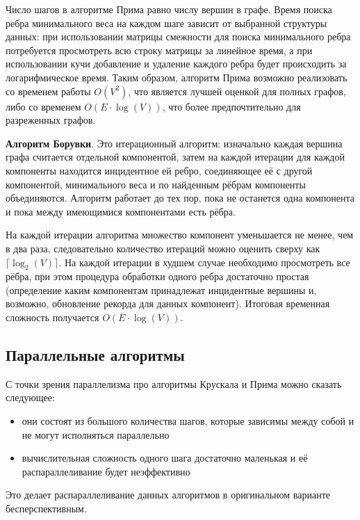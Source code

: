 \documentclass[a4paper,10pt]{extarticle}
\begin{document}
Число шагов в алгоритме Прима равно числу вершин в графе. Время поиска ребра минимального веса на каждом шаге зависит от выбранной структуры данных: при использовании матрицы смежности для поиска минимального ребра потребуется просмотреть всю строку матрицы за линейное время, а при использовании кучи добавление и удаление каждого ребра будет происходить за логарифмическое время. 
Таким образом, алгоритм Прима возможно реализовать со временем работы $O(V^2)$, что является лучшей оценкой для полных графов, либо со временем $O(E \cdot \log(V))$, что более предпочтительно для разреженных графов.


\textbf{Алгоритм Борувки}.
Это итерационный алгоритм: изначально каждая вершина графа считается отдельной компонентой, затем на каждой итерации для каждой компоненты находится инцидентное ей ребро, соединяющее её с другой компонентой, минимального веса и по найденным рёбрам компоненты объединяются. Алгоритм работает до тех пор, пока не останется одна компонента и пока между имеющимися компонентами есть рёбра.

На каждой итерации алгоритма множество компонент уменьшается не менее, чем в два раза, следовательно количество итераций можно оценить сверху как $\lceil \log_2(V) \rceil$. На каждой итерации в худшем случае необходимо просмотреть все рёбра, при этом процедура обработки одного ребра достаточно простая (определение каким компонентам принадлежат инцидентные вершины и, возможно, обновление рекорда для данных компонент). Итоговая временная сложность получается $O(E \cdot \log(V))$.

\subsection{Параллельные алгоритмы}

С точки зрения параллелизма про алгоритмы Крускала и Прима можно сказать следующее:
\begin{itemize}
	\item они состоят из большого количества шагов, которые зависимы между собой и не могут исполняться параллельно
	\item вычислительная сложность одного шага достаточно маленькая и её распараллеливание будет неэффективно
\end{itemize}
Это делает распараллеливание данных алгоритмов в оригинальном варианте бесперспективным. 
\end{document}
